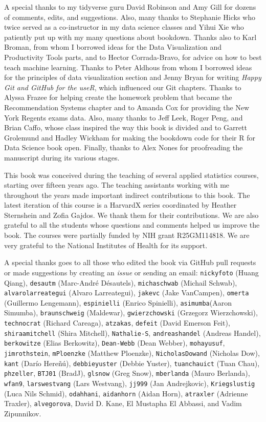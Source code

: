 \documentclass[
]{krantz}
\begin{document}
A special thanks to my tidyverse guru David Robinson and Amy Gill for dozens of comments, edits, and suggestions. Also, many thanks to Stephanie Hicks who twice served as a co-instructor in my data science classes and Yihui Xie who patiently put up with my many questions about bookdown. Thanks also to Karl Broman, from whom I borrowed ideas for the Data Visualization and Productivity Tools parts, and to Hector Corrada-Bravo, for advice on how to best teach machine learning. Thanks to Peter Aldhous from whom I borrowed ideas for the principles of data visualization section and Jenny Bryan for writing \emph{Happy Git and GitHub for the useR}, which influenced our Git chapters. Thanks to
Alyssa Frazee for helping create the homework problem that became the Recommendation Systems chapter and to Amanda Cox for providing the New York Regents exams data. Also, many thanks to Jeff Leek, Roger Peng, and Brian Caffo, whose class inspired the way this book is divided and to Garrett Grolemund and Hadley Wickham for making the bookdown code for their R for Data Science book open. Finally, thanks to Alex Nones for proofreading the manuscript during its various stages.

This book was conceived during the teaching of several applied statistics courses, starting over fifteen years ago. The teaching assistants working with me throughout the years made important indirect contributions to this book. The latest iteration of this course is a HarvardX series coordinated by Heather Sternshein and Zofia Gajdos. We thank them for their contributions. We are also grateful to all the students whose questions and comments helped us improve the book. The courses were partially funded by NIH grant R25GM114818. We are very grateful to the National Institutes of Health for its support.

A special thanks goes to all those who edited the book via GitHub pull requests or made suggestions by creating an \emph{issue} or sending an email: \texttt{nickyfoto} (Huang Qiang), \texttt{desautm} (Marc-André Désautels), \texttt{michaschwab} (Michail Schwab), \texttt{alvarolarreategui} (Alvaro Larreategui), \texttt{jakevc} (Jake VanCampen), \texttt{omerta} (Guillermo Lengemann), \texttt{espinielli} (Enrico Spinielli), \texttt{asimumba}(Aaron Simumba), \texttt{braunschweig} (Maldewar), \texttt{gwierzchowski} (Grzegorz Wierzchowski), \texttt{technocrat} (Richard Careaga), \texttt{atzakas}, \texttt{defeit} (David Emerson Feit), \texttt{shiraamitchell} (Shira Mitchell), \texttt{Nathalie-S}, \texttt{andreashandel} (Andreas Handel), \texttt{berkowitze} (Elias Berkowitz), \texttt{Dean-Webb} (Dean Webber), \texttt{mohayusuf}, \texttt{jimrothstein}, \texttt{mPloenzke} (Matthew Ploenzke), \texttt{NicholasDowand} (Nicholas Dow), \texttt{kant} (Darío Hereñú), \texttt{debbieyuster} (Debbie Yuster), \texttt{tuanchauict} (Tuan Chau), \texttt{phzeller}, \texttt{BTJ01} (BradJ), \texttt{glsnow} (Greg Snow), \texttt{mberlanda} (Mauro Berlanda), \texttt{wfan9}, \texttt{larswestvang} (Lars Westvang), \texttt{jj999} (Jan Andrejkovic), \texttt{Kriegslustig} (Luca Nils Schmid), \texttt{odahhani}, \texttt{aidanhorn} (Aidan Horn), \texttt{atraxler} (Adrienne Traxler), \texttt{alvegorova},
David D. Kane, El Mustapha El Abbassi, and Vadim Zipunnikov.
\end{document}
